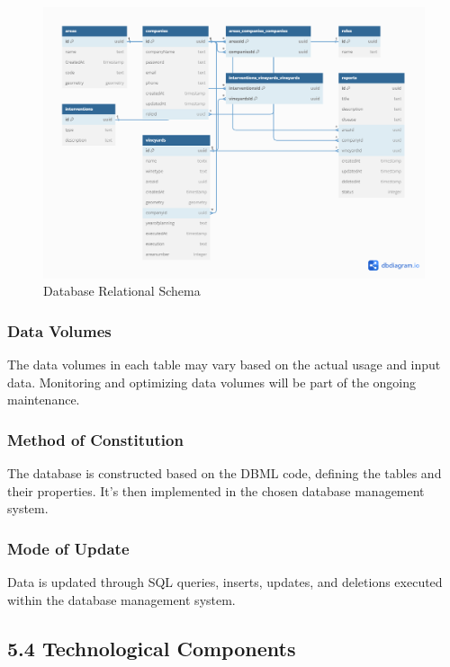 \begin{figure}[htbp]
    \centering
    \includegraphics[width=\textwidth]{images/database.png}
    \caption{Database Relational Schema}
    \label{fig:database_schema}
\end{figure}

\subsubsection{Data Volumes}

The data volumes in each table may vary based on the actual usage and input data. Monitoring and optimizing data volumes will be part of the ongoing maintenance.

\subsubsection{Method of Constitution}

The database is constructed based on the DBML code, defining the tables and their properties. It's then implemented in the chosen database management system.

\subsubsection{Mode of Update}

Data is updated through SQL queries, inserts, updates, and deletions executed within the database management system.



\subsection{5.4 Technological Components}
